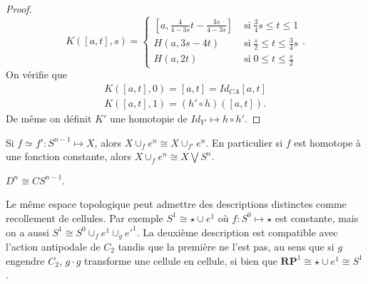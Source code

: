\documentclass[main.tex]{subfiles}
\begin{document}
\begin{proof}
\[			K([a,t],s) = \begin{cases}
				[a, \frac{4}{4-3s}t-\frac{3s}{4-3s}] \; &\text{si} \; \frac{3}{4}s \le t \le 1 \\
				H(a,3s-4t) \; &\text{si} \; \frac{s}{2} \le t \le \frac{3}{4}s \\
				H(a,2t) \; &\text{si} \; 0 \le t \le \frac{s}{2}
			\end{cases}
		.\] 
		On vérifie que 
		\begin{align*}
			K([a,t],0) = [a,t] = Id_{CA}[a,t] \\
			K([a,t],1) = (h'\circ h)([a,t])
		.\end{align*}
		De même on définit $K'$ une homotopie de  $Id_{Y'} \longmapsto h \circ h'$.
	\end{proof}
	\begin{cor}
		Si $f \simeq f' : S^{n-1} \longmapsto X$, alors $X \cup_f e^n \cong X \cup_{f'}e^n$. En particulier si $f$ est homotope à une fonction constante, alors $X \cup_f e^n \cong X \bigvee S^n$.
	\end{cor}
	\begin{prop}
		$D^n \cong CS^{n-1}$.
	\end{prop}
	\begin{example}
		Le même espace topologique peut admettre des descriptions distinctes comme recollement de cellules. Par exemple $S^1 \cong \star \cup e^1$ où  $f : S^0 \longmapsto \star$ est constante, mais on a aussi $S^1 \cong S^0 \cup_f e^1 \cup_g e'^1$. La deuxième description est compatible avec l'action antipodale de $C_2$ tandis que la première ne l'est pas, au sens que si $g$ engendre  $C_2$,  $g \cdot g$ transforme une cellule en cellule, si bien que $\mathbf{RP}^1 \cong \star \cup e^1 \cong S^1$.
	\end{example}
\end{document}
